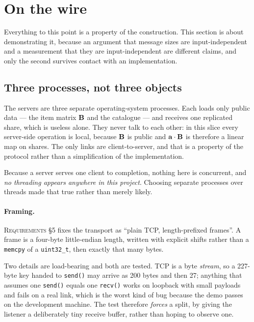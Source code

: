 \section{On the wire}
\label{sec:tech:net}

Everything to this point is a property of the construction. This section is
about demonstrating it, because an argument that message sizes are
input-independent and a measurement that they are input-independent are
different claims, and only the second survives contact with an implementation.

\subsection{Three processes, not three objects}
\label{sec:tech:net:processes}

The servers are three separate operating-system processes. Each loads only
public data --- the item matrix $\mathbf{B}$ and the catalogue --- and receives
one replicated share, which is useless alone. They never talk to each other:
in this slice every server-side operation is local, because $\mathbf{B}$ is
public and $\mathbf{a}\cdot\mathbf{B}$ is therefore a linear map on shares. The
only links are client-to-server, and that is a property of the protocol rather
than a simplification of the implementation.

Because a server serves one client to completion, nothing here is concurrent,
and \emph{no threading appears anywhere in this project}. Choosing separate
processes over threads made that true rather than merely likely.

\paragraph{Framing.} \textsc{Requirements} \S5 fixes the transport as ``plain
TCP, length-prefixed frames''. A frame is a four-byte little-endian length,
written with explicit shifts rather than a \texttt{memcpy} of a
\texttt{uint32\_t}, then exactly that many bytes.

Two details are load-bearing and both are tested. TCP is a byte \emph{stream},
so a 227-byte key handed to \texttt{send()} may arrive as 200 bytes and then
27; anything that assumes one \texttt{send()} equals one \texttt{recv()} works
on loopback with small payloads and fails on a real link, which is the worst
kind of bug because the demo passes on the development machine. The test
therefore \emph{forces} a split, by giving the listener a deliberately tiny
receive buffer, rather than hoping to observe one.


